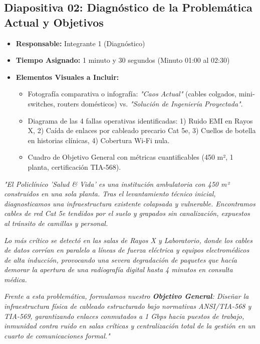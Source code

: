 \documentclass[11pt,a4paper]{article}
\begin{document}
\vspace{0.5cm}

\subsection{Diapositiva 02: Diagnóstico de la Problemática Actual y Objetivos}
\begin{itemize}[leftmargin=*]
    \item \textbf{Responsable:} Integrante 1 (Diagnóstico)
    \item \textbf{Tiempo Asignado:} 1 minuto y 30 segundos (Minuto 01:00 al 02:30)
    \item \textbf{Elementos Visuales a Incluir:}
    \begin{itemize}
        \item Fotografía comparativa o infografía: \textit{"Caos Actual"} (cables colgados, mini-switches, routers domésticos) vs. \textit{"Solución de Ingeniería Proyectada"}.
        \item Diagrama de las 4 fallas operativas identificadas: 1) Ruido EMI en Rayos X, 2) Caída de enlaces por cableado precario Cat 5e, 3) Cuellos de botella en historias clínicas, 4) Cobertura Wi-Fi nula.
        \item Cuadro de Objetivo General con métricas cuantificables (450 m², 1 planta, certificación TIA-568).
    \end{itemize}
\end{itemize}

\begin{tcolorbox}[colback=white,colframe=primaryblue,title=\textbf{Speech Verbal del Integrante 1 (Guion Palabra por Palabra)}]
\textit{"El Policlínico 'Salud \& Vida' es una institución ambulatoria con 450 m² construidos en una sola planta. Tras el levantamiento técnico inicial, diagnosticamos una infraestructura existente colapsada y vulnerable. Encontramos cables de red Cat 5e tendidos por el suelo y grapados sin canalización, expuestos al tránsito de camillas y personal.}\par\vspace{2mm}
\textit{Lo más crítico se detectó en las salas de Rayos X y Laboratorio, donde los cables de datos corrían en paralelo a líneas de fuerza eléctrica y equipos electromédicos de alta inducción, provocando una severa degradación de paquetes que hacía demorar la apertura de una radiografía digital hasta 4 minutos en consulta médica.}\par\vspace{2mm}
\textit{Frente a esta problemática, formulamos nuestro \textbf{Objetivo General}: Diseñar la infraestructura física de cableado estructurado bajo normativas ANSI/TIA-568 y TIA-569, garantizando enlaces conmutados a 1 Gbps hacia puestos de trabajo, inmunidad contra ruido en salas críticas y centralización total de la gestión en un cuarto de comunicaciones formal."}
\end{tcolorbox}
\end{document}
